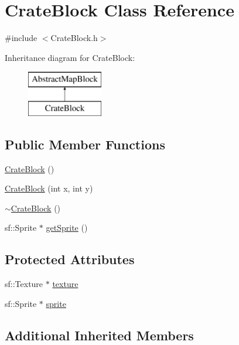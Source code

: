 \hypertarget{class_crate_block}{}\section{Crate\+Block Class Reference}
\label{class_crate_block}


{\ttfamily \#include $<$Crate\+Block.\+h$>$}

Inheritance diagram for Crate\+Block\+:\begin{figure}[H]
\begin{center}
\leavevmode
\includegraphics[height=2.000000cm]{class_crate_block}
\end{center}
\end{figure}
\subsection*{Public Member Functions}
\begin{DoxyCompactItemize}
\item 
\hyperlink{class_crate_block_a1a5d0818a3b1a878b7183b27461bcde4}{Crate\+Block} ()
\item 
\hyperlink{class_crate_block_af425285a43dc8a3eaf63a1abf91987cf}{Crate\+Block} (int x, int y)
\item 
\hyperlink{class_crate_block_aa853be5155fd0094454b2f25fb24c719}{$\sim$\+Crate\+Block} ()
\item 
sf\+::\+Sprite $\ast$ \hyperlink{class_crate_block_a1f478270194247d4e1f7f4b5eb883be9}{get\+Sprite} ()
\end{DoxyCompactItemize}
\subsection*{Protected Attributes}
\begin{DoxyCompactItemize}
\item 
sf\+::\+Texture $\ast$ \hyperlink{class_crate_block_a94ec4c6400389af2e8f1cd532c17eb5e}{texture}
\item 
sf\+::\+Sprite $\ast$ \hyperlink{class_crate_block_af4bed3d444d90dad4dd8a10c032c9724}{sprite}
\end{DoxyCompactItemize}
\subsection*{Additional Inherited Members}


